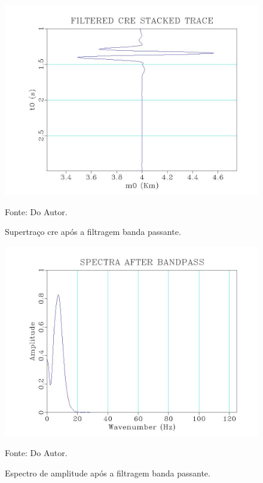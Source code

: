 \begin{figure}
\caption{Supertraço cre após a filtragem banda passante.}
\begin{center}
\includegraphics[scale=0.4]{images/creStackedSectionFiltered.jpeg}
\vspace{-0.3cm}
\end{center}
\begin{center}
 Fonte: Do Autor.
\end{center}
\label{fig:7.4}
\end{figure}

\begin{figure}
\caption{Espectro de amplitude após a filtragem banda passante.}
\begin{center}
\includegraphics[scale=0.4]{images/filteredSpectra.jpeg}
\vspace{-0.3cm}
\end{center}
\begin{center}
 Fonte: Do Autor.
\end{center}
\label{fig:7.5}
\end{figure}


